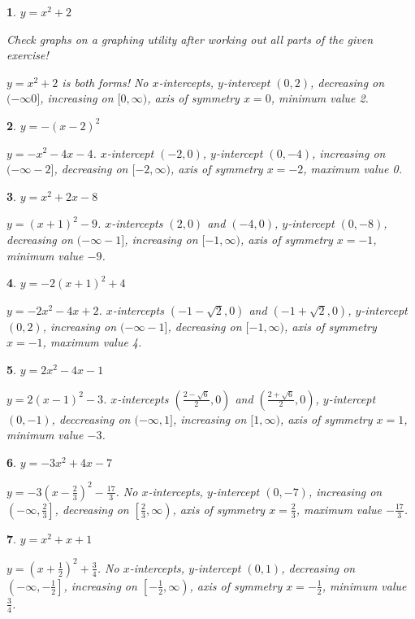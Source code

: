 \documentclass{amsbook}
\newtheorem{exc}{}
\newenvironment{ex}{\begin{exc}\normalfont}{\end{exc}}
\numberwithin{section}{chapter}
\numberwithin{equation}{chapter}
\begin{document}
\begin{multicols}{3}

\begin{ex}
	$y=x^2+2$ 
	\begin{sol}
	Check graphs on a graphing utility \textit{after} working out all parts of the given exercise!
	
	 $y=x^2+2$ is both forms! No $x$-intercepts, $y$-intercept $(0,2)$, decreasing on $(-\infty 0]$, increasing on $[0,\infty)$, axis of symmetry $x=0$, minimum value 2.  
	\end{sol}
\end{ex}
\begin{ex}
	$y=-(x-2)^2$ 
	\begin{sol}
		$y=-x^2-4x-4$. $x$-intercept $(-2,0)$, $y$-intercept $(0,-4)$, increasing on $(-\infty -2]$, decreasing on $[-2,\infty)$, axis of symmetry $x=-2$, maximum value 0.  
	\end{sol}
\end{ex}
\begin{ex}
	$y=x^2+2x-8$ 
	\begin{sol}
		$y=(x+1)^2-9$. $x$-intercepts $(2,0)$ and $(-4,0)$, $y$-intercept $(0,-8)$, decreasing on $(-\infty -1]$, increasing on $[-1,\infty)$, axis of symmetry $x=-1$, minimum value $-9$.  
	\end{sol}
\end{ex}
\begin{ex}
	$y=-2(x+1)^2+4$ 
	\begin{sol}
		$y=-2x^2-4x+2$. $x$-intercepts $(-1-\sqrt{2},0)$ and $(-1+\sqrt{2},0)$, $y$-intercept $(0,2)$, increasing on $(-\infty -1]$, decreasing on $[-1,\infty)$, axis of symmetry $x=-1$, maximum value 4.  
	\end{sol}
\end{ex}
\begin{ex}
	$y=2x^2-4x-1$ 
	\begin{sol}
		$y=2(x-1)^2-3$. $x$-intercepts $\left( \frac{2-\sqrt{6}}{2}, 0 \right)$ and $\left( \frac{2+\sqrt{6}}{2}, 0 \right)$, $y$-intercept $(0,-1)$, deccreasing on $(-\infty, 1]$, increasing on $[1,\infty)$, axis of symmetry $x=1$, minimum value $-3$.  
	\end{sol}
\end{ex}
\begin{ex}
	$y=-3x^2+4x-7$ 
	\begin{sol}
		$y=-3\left( x-\frac{2}{3} \right)^2-\frac{17}{3}$. No $x$-intercepts, $y$-intercept $(0,-7)$, increasing on $\left(-\infty ,\frac{2}{3}\right]$, decreasing on $\left[\frac{2}{3},\infty\right)$, axis of symmetry $x=\frac{2}{3}$, maximum value $-\frac{17}{3}$.  
	\end{sol}
\end{ex}
\begin{ex}
	$y=x^2+x+1$ 
	\begin{sol}
		$y=\left( x+\frac{1}{2} \right)^2+\frac{3}{4}$. No $x$-intercepts, $y$-intercept $(0,1)$, decreasing on $\left(-\infty ,-\frac{1}{2}\right]$, increasing on $\left[-\frac{1}{2},\infty\right)$, axis of symmetry $x=-\frac{1}{2}$, minimum value $\frac{3}{4}$.  
	\end{sol}
\end{ex}


\end{multicols}
\end{document}
